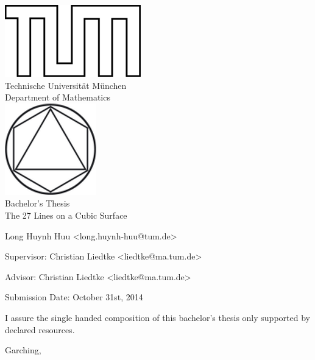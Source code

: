 \begin{titlepage}
\begin{center}
\includegraphics{TUMlschwarz.png}\\[3mm]
\sf
{\Large
  Technische Universit\"at M\"unchen\\[5mm]
  Department of Mathematics\\[8mm]
}
\normalsize
\includegraphics{TUMlMschwarz.png}\\[15mm]

Bachelor's Thesis\\[15mm]

{\Huge
  The 27 Lines on a Cubic Surface
}
\bigskip

\normalsize

Long Huynh Huu <long.huynh-huu@tum.de>
\end{center}
\vspace*{75mm}

Supervisor: Christian Liedtke <liedtke@ma.tum.de>
\medskip

Advisor: Christian Liedtke <liedtke@ma.tum.de>
\medskip

Submission Date: October 31st, 2014

\end{titlepage}


\vspace*{150mm}

I assure the single handed composition of this bachelor's thesis only supported by declared resources.
\bigskip

Garching, 
\newpage
